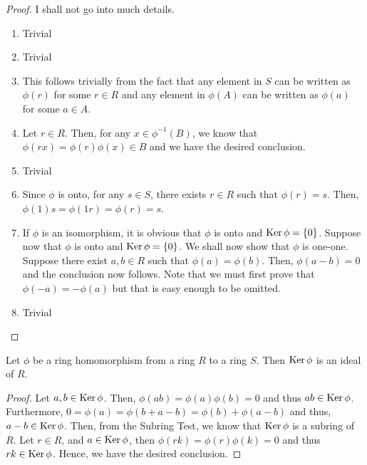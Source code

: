 \begin{proof}
	I shall not go into much details.
	\begin{enumerate}
		\item Trivial
		\item Trivial
		\item This follows trivially from the fact that any element in $S$ can be written as $\phi(r)$ for some $r\in R$ and any element in $\phi(A)$ can be written as $\phi(a)$ for some $a\in A$.
		\item Let $r\in R$. Then, for any $x\in\phi^{-1}(B)$, we know that $\phi(rx) = \phi(r)\phi(x) \in B$ and we have the desired conclusion.
		\item Trivial
		\item Since $\phi$ is onto, for any $s\in S$, there exists $r\in R$ such that $\phi(r)=s$. Then, $\phi(1)s = \phi(1r) = \phi(r) = s$.
		\item If $\phi$ is an isomorphism, it is obvious that $\phi$ is onto and $\operatorname{Ker}\phi=\{0\}$. Suppose now that $\phi$ is onto and $\operatorname{Ker}\phi=\{0\}$. We shall now show that $\phi$ is one-one. Suppose there exist $a,b\in R$ such that $\phi(a)=\phi(b)$. Then, $\phi(a-b)=0$ and the conclusion now follows. Note that we must first prove that $\phi(-a)=-\phi(a)$ but that is easy enough to be omitted.
		\item Trivial
	\end{enumerate}
\end{proof}

\begin{proposition}
	Let $\phi$ be a ring homomorphism from a ring $R$ to a ring $S$. Then $\operatorname{Ker}\phi$ is an ideal of $R$.
\end{proposition}
\begin{proof}
	Let $a,b\in\operatorname{Ker}\phi$. Then, $\phi(ab) = \phi(a)\phi(b) = 0$ and thus $ab\in\operatorname{Ker}\phi$. Furthermore, $0=\phi(a)=\phi(b+a-b)=\phi(b)+\phi(a-b)$ and thus, $a-b\in\operatorname{Ker}\phi$. Then, from the Subring Test, we know that $\operatorname{Ker}\phi$ is a subring of $R$. Let $r\in R$, and $a\in\operatorname{Ker}\phi$, then $\phi(rk) = \phi(r)\phi(k) = 0$ and thus $rk\in\operatorname{Ker}\phi$. Hence, we have the desired conclusion.
\end{proof}

